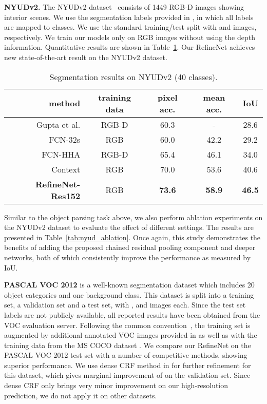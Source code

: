 \documentclass[10pt,twocolumn,letterpaper]{article}
\def\best{\bf \cellcolor[gray]{0.85}}
\def\secbest{\cellcolor[gray]{0.92} }
\newcommand{\myparagraph}[1]{\vspace{.5em}\noindent\textbf{#1}}
\begin{document}
\myparagraph{NYUDv2.}
The NYUDv2 dataset~\cite{silberman2012indoor} consists of 1449 RGB-D images showing interior scenes. We use the segmentation labels provided in \cite{gupta2013perceptual}, in which all labels are mapped to  classes.
We use the standard training/test split with  and  images, respectively.
We train our models only on RGB images without using the depth information.
Quantitative results are shown in Table~\ref{tab:nyud}. Our RefineNet achieves new state-of-the-art result on the NYUDv2 dataset.
\begin{table}[t]
\caption{Segmentation results on NYUDv2 (40 classes).
}
\centering
\resizebox{.95\linewidth}{!}
  {
  \begin{tabular}{ r | c | c c c }
method  &training data  &pixel acc. &mean acc. &IoU\\ \hline \hline
Gupta et al. \cite{gupta2014learning}   &RGB-D  &60.3 &-  &28.6\\
FCN-32s \cite{LongSD14} &RGB  &60.0 &42.2 &29.2\\
FCN-HHA \cite{LongSD14} &RGB-D  &65.4 &46.1 &34.0\\ 
Context \cite{lin2016piece} &RGB  &\secbest 70.0  & \secbest 53.6  & \secbest 40.6\\ \hline \hline
\bf RefineNet-Res152 &RGB  & \best 73.6  & \best 58.9  & \best 46.5\\
 \end{tabular}
  }
\label{tab:nyud}
\end{table}




Similar to the object parsing task above, we also perform ablation experiments on the NYUDv2 dataset to evaluate the effect of different settings. The results are presented in Table~\ref{tab:nyud_ablation}.
Once again, this study demonstrates the benefits of adding the proposed chained residual pooling component and deeper networks, both of which consistently improve the performance as measured by IoU.





\myparagraph{PASCAL VOC 2012}
\cite{everingham2010pascal} is a well-known segmentation dataset which includes 20 object categories and one background class.
This dataset is split into a training set, a validation set and a test set,
with ,  and  images each. 
Since the test set labels are not publicly available, all reported results have been obtained from the VOC evaluation server.
Following the common convention~\cite{ChenPKMY14,ChenPK0Y16,zheng2015conditional,LiuDPN}, 
the training set is augmented by additional annotated VOC images provided in \cite{HariharanABMM11} as well as with the training data from the MS COCO dataset \cite{lin2014microsoft}.
We compare our RefineNet on the PASCAL VOC 2012 test set with
a number of competitive methods, showing superior performance.
We use dense CRF method in \cite{krahenbuhl2012efficient} for further refinement for this dataset, which gives marginal improvement of  on the validation set.
Since dense CRF only brings very minor improvement on our high-resolution prediction, we do not apply it on other datasets.
\end{document}
